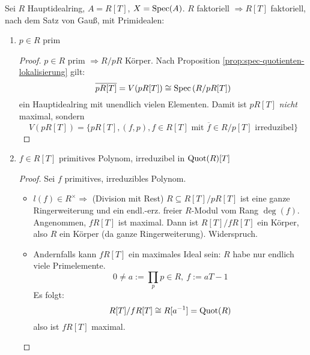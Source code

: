 \begin{example}
\label{bsp:spec-polynomring-ueber-hauptidealring}	
  Sei $R$ Hauptidealring, $A=R[T]$, $X=\operatorname{Spec}(A)$. $R$ faktoriell $\Rightarrow R[T]$ faktoriell, nach dem Satz von Gauß, mit Primidealen:
  \begin{enumerate}
  \item $p\in R$ prim
    \begin{proof}
      $p\in R$ prim $\Rightarrow R/pR$ Körper. Nach Proposition \ref{prop:spec-quotienten-lokalisierung} gilt:
      \[
        \overline{pR[T]}=V(pR[T])\cong\operatorname{Spec}\left(R/pR[T]\right)
      \]
      ein Hauptidealring mit unendlich vielen Elementen. Damit ist $pR[T]$
      \emph{nicht} maximal, sondern
      \[ V(pR[T])=\{pR[T], (f,p), f\in R[T]
          \text{ mit } \overline{f}\in R/p[T]
        \text{ irreduzibel}\}
      \]
    \end{proof}
  \item $f\in R[T]$ primitives Polynom, irreduzibel in $\operatorname{Quot}(R)[T]$
    \begin{proof}
      Sei $f$ primitives, irreduzibles Polynom.
      \begin{itemize}
      \item $l(f)\in R^{\times} \Rightarrow$ (Division mit Rest)
        $R\subseteq R[T]/pR[T]$ ist eine ganze Ringerweiterung
        und ein endl.-erz. freier $R$-Modul vom Rang $\deg(f)$.
        Angenommen, $fR[T]$ ist maximal. Dann ist $R[T]/fR[T]$ ein Körper,
        also $R$ ein Körper (da ganze Ringerweiterung). Widerspruch.
      \item Andernfalls kann $fR[T]$ ein maximales Ideal sein: $R$ habe nur
        endlich viele Primelemente.
        \[
          0\neq a := \prod_{p} p\in R,\ f:=aT-1
        \]
        Es folgt:
        \[
          R[T]/fR[T]\cong R[a^{-1}]=\operatorname{Quot}(R)
        \]
        also ist $fR[T]$ maximal.
      \end{itemize}
    \end{proof}
  \end{enumerate}
\end{example}

